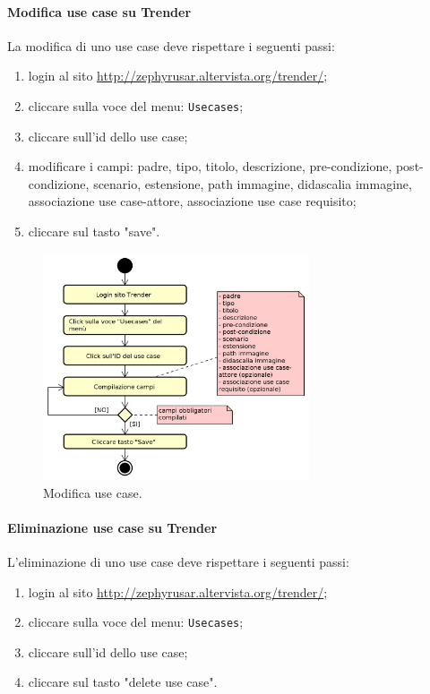 	    \paragraph{Modifica use case su Trender}
	    La modifica di uno use case deve rispettare i seguenti passi:
	    \begin{enumerate}
	    	\item login al sito \url{http://zephyrusar.altervista.org/trender/};
	    	\item cliccare sulla voce del menu: \texttt{Usecases};
	    	\item cliccare sull'id dello use case;
	    	\item modificare i campi: padre, tipo, titolo, descrizione, pre-condizione, post-condizione, scenario, estensione, path immagine, didascalia immagine, associazione use case-attore, associazione use case requisito;
	    	\item cliccare sul tasto "save".
	    \end{enumerate}
	    \begin{figure}[H]
	    	\centering
	    	\includegraphics[width=0.7\textwidth]{img/ModificaUC}
	    	\caption{Modifica use case.}
	    \end{figure}
	    
	    \paragraph{Eliminazione use case su Trender}
	    L'eliminazione di uno use case deve rispettare i seguenti passi:
	    \begin{enumerate}
	    	\item login al sito \url{http://zephyrusar.altervista.org/trender/};
	    	\item cliccare sulla voce del menu: \texttt{Usecases};
	    	\item cliccare sull'id dello use case;
	    	\item cliccare sul tasto "delete use case".
	    \end{enumerate}

